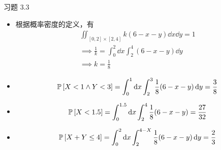 \begin{problem}
    习题 3.3
    \begin{solution}
        \begin{itemize}
            \item[\textbf{1)}] 根据概率密度的定义，有
            $$
            \begin{gathered}
                \iint_{[0, 2] \times [2, 4]} k (6 - x - y) \dd{x} \dd{y} = 1 \\
                \implies \frac{1}{k} = \int_{0}^{2} \dd{x} \int_{2}^{4} (6 - x - y) \dd{y} \\
                \implies k = \frac{1}{8}
            \end{gathered}
            $$
            \item[\textbf{2)}]
            $$
            \operatorname{\mathbb{P}}\left[X < 1 \land Y < 3\right] = \int_{0}^{1} \dd{x} \int_{2}^{3} \frac{1}{8} (6 - x - y) \dd{y} = \frac{3}{8}
            $$
            \item[\textbf{3)}]
            $$
            \operatorname{\mathbb{P}}\left[X < 1.5\right] = \int_{0}^{1.5} \dd{x} \int_{2}^{4} \frac{1}{8} (6 - x - y) = \frac{27}{32}
            $$
            \item[\textbf{4)}]
            $$
            \operatorname{\mathbb{P}}\left[X + Y \le 4\right] = \int_{0}^{2} \dd{x} \int_{2}^{4 - X} \frac{1}{8} (6 - x - y) \dd{y} = \frac{2}{3}
            $$
        \end{itemize}
    \end{solution}
\end{problem}

